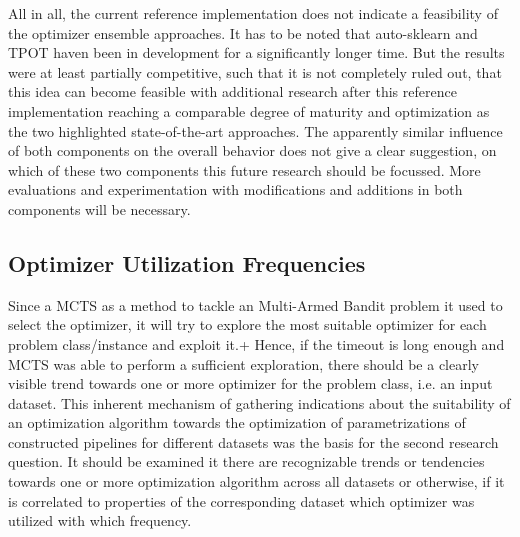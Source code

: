 All in all, the current reference implementation does not indicate a feasibility of the optimizer ensemble approaches.
It has to be noted that auto-sklearn and TPOT haven been in development for a significantly longer time.
But the results were at least partially competitive, such that it is not completely ruled out, that this idea can become feasible with additional research after this reference implementation reaching a comparable degree of maturity and optimization as the two highlighted state-of-the-art approaches.\newline
The apparently similar influence of both components on the overall behavior does not give a clear suggestion, on which of these two components this future research should be focussed.
More evaluations and experimentation with modifications and additions in both components will be necessary.

\subsection{Optimizer Utilization Frequencies}
\label{sec:evaluation:analysis:optimizer}
Since a MCTS as a method to tackle an Multi-Armed Bandit problem it used to select the optimizer, it will try to explore the most suitable optimizer for each problem class/instance and exploit it.+
Hence, if the timeout is long enough and MCTS was able to perform a sufficient exploration, there should be a clearly visible trend towards one or more optimizer for the problem class, i.e. an input dataset.\newline
This inherent mechanism of gathering indications about the suitability of an optimization algorithm towards the optimization of parametrizations of constructed pipelines for different datasets was the basis for the second research question.
It should be examined it there are recognizable trends or tendencies towards one or more optimization algorithm across all datasets or otherwise, if it is correlated to properties of the corresponding dataset which optimizer was utilized with which frequency.

